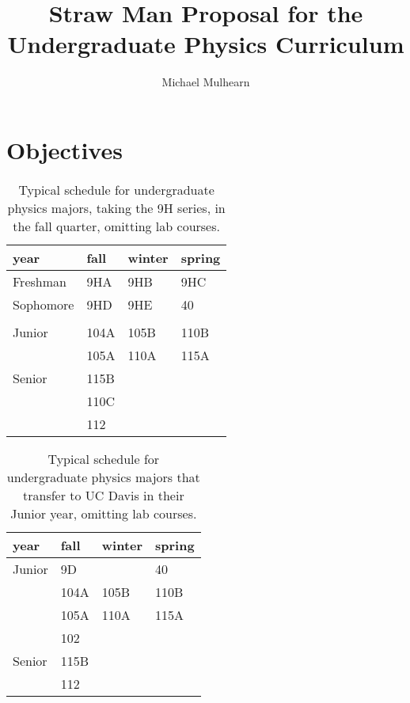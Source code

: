 \documentclass[12pt]{article}
\begin{document}

\title{Straw Man Proposal for the \\ Undergraduate Physics Curriculum}
\author{Michael Mulhearn}

\maketitle

\section{Objectives}

\begin{table}
\caption{Typical schedule for undergraduate physics majors, taking the 9H series, in the fall quarter, omitting lab courses.}
\label{tbl:current-honors}
\begin{center}
\begin{tabular}{|l|l|l|l|}
\hline
year      & fall    & winter & spring  \\
\hline
Freshman  & 9HA  & 9HB  & 9HC \\
\hline
Sophomore & 9HD  & 9HE   & 40     \\
          &      &        &        \\
\hline
Junior    & 104A & 105B & 110B\\
          & 105A & 110A & 115A\\
\hline
Senior    & 115B &        & \\
          & 110C &        & \\
          & 112  &        & \\

\hline 
\end{tabular}
\end{center}
\end{table}

\begin{table}
\caption{Typical schedule for undergraduate physics majors that transfer to UC Davis in their Junior year, omitting lab courses.}
\label{tbl:current-transfers}
\begin{center}
\begin{tabular}{|l|l|l|l|}
\hline
year      & fall    & winter & spring  \\
\hline
Junior    & 9D  &    & 40     \\
          & 104A & 105B & 110B\\
          & 105A & 110A & 115A\\
          & 102 &       & \\
\hline
Senior    & 115B &        & \\
          & 112  &        & \\
\hline 
\end{tabular}
\end{center}
\end{table}
\end{document}
